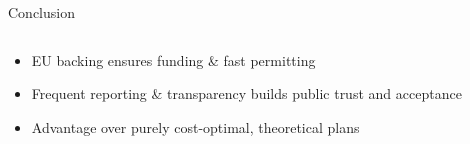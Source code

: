 \documentclass[10pt,aspectratio=169,dvipsnames]{beamer}
\begin{document}
\begin{frame}{Conclusion}
\begin{columns}[t,onlytextwidth]
    \vspace{-0.2cm}
    
    \begin{tcolorbox}[colback=red!5, colframe=red!50!black, fonttitle=\bfseries, title=Political support \& acceptance]
    \centering
    \scriptsize
     \begin{itemize}
      \item EU backing ensures funding \& fast permitting  
      \item Frequent reporting \& transparency builds public trust and acceptance
      \item Advantage over purely cost-optimal, theoretical plans
    \end{itemize}
    \end{tcolorbox}
\end{columns}
\end{frame}

\end{document}
